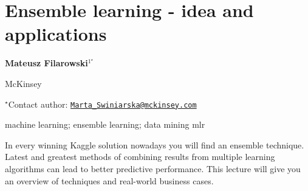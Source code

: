 \documentclass[\main/boa.tex]{subfiles}
\begin{document}
\section{Ensemble learning - idea and applications}

\begin{center}
  {\bf Mateusz Filarowski$^{1^\star}$}
\end{center}

\vskip 0.3cm

\begin{affiliations}
\begin{enumerate}
\begin{minipage}{0.915\textwidth}
\centering
\item McKinsey \\[-2pt]
\end{minipage}
\end{enumerate}
$^\star$Contact author: \href{mailto:Marta_Swiniarska@mckinsey.com}{\nolinkurl{Marta\_Swiniarska@mckinsey.com}}\\
\end{affiliations}

\vskip 0.5cm

\begin{minipage}{0.915\textwidth}
\keywords machine learning; ensemble learning; data mining
\packages mlr
\end{minipage}

\vskip 0.8cm

In every winning Kaggle solution nowadays you will find an ensemble
technique. Latest and greatest methods of combining results from
multiple learning algorithms can lead to better predictive performance.
This lecture will give you an overview of techniques and real-world
business cases.
\end{document}
